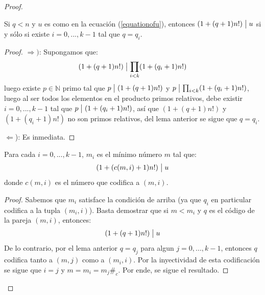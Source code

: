 \documentclass[12pt]{report}
\theoremstyle{largebreak}
\newcommand\divides{\ensuremath{\bigm|}}
\newcommand\contradiction{\ensuremath{\#_c}}
\begin{document}
\begin{proof}
        \begin{lema}
            Si $q<n$ y $u$ es como en la ecuación (\ref{equationofu}), entonces $(1+(q+1)n!)\divides u$ si y sólo si existe $i=0,...,k-1$ tal que $q=q_i$.
        \end{lema}

        \begin{proof}
            $\Rightarrow)$: Supongamos que:
            \begin{equation*}
                (1+(q+1)n!)\divides\prod_{ i<k}(1+(q_i+1)n!)
            \end{equation*}
            luego existe $p\in\mathbb{N}$ primo tal que $p\divides(1+(q+1)n!)$ y $p\divides\prod_{ i<k}(1+(q_i+1)n!)$, luego al ser todos los elementos en el producto primos relativos, debe existir $i=0,...,k-1$ tal que $p\divides(1+(q_i+1)n!)$, así que $(1+(q+1)n!)$ y $(1+(q_i+1)n!)$ no son primos relativos, del lema anterior se sigue que $q=q_i$.

            $\Leftarrow$): Es inmediata.
        \end{proof}

        \begin{lema}
            Para cada $i=0,...,k-1$, $m_i$ es el mínimo número $m$ tal que:
            \begin{equation*}
                \left(1+(c(m,i)+1)n! \right)\divides u
            \end{equation*}
            donde $c(m,i)$ es el número que codifica a $(m,i)$.
        \end{lema}

        \begin{proof}
            Sabemos que $m_i$ satisface la condición de arriba (ya que $q_i$ en particular codifica a la tupla $(m_i,i)$). Basta demostrar que si $m<m_i$ y $q$ es el código de la pareja $(m,i)$, entonces:
            \begin{equation*}
                \left(1+(q+1)n! \right)\divides u
            \end{equation*}
            De lo contrario, por el lema anterior $q=q_j$ para algun $j=0,...,k-1$, entonces $q$ codifica tanto a $(m,j)$ como a $(m_i,i)$. Por la inyectividad de esta codificación se sigue que $i=j$ y $m=m_i=m_j$\contradiction. Por ende, se sigue el resultado.
        \end{proof}


\end{proof}
\end{document}
